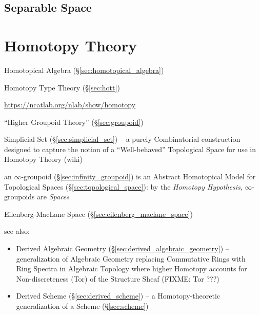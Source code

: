 \subsection{Separable Space}\label{sec:separable_space}



\section{Homotopy Theory}\label{sec:homotopy_theory}

Homotopical Algebra (\S\ref{sec:homotopical_algebra})

Homotopy Type Theory (\S\ref{sec:hott})

\url{https://ncatlab.org/nlab/show/homotopy}

``Higher Groupoid Theory'' (\S\ref{sec:groupoid})

Simplicial Set (\S\ref{sec:simplicial_set}) -- a purely Combinatorial
construction designed to capture the notion of a ``Well-behaved'' Topological
Space for use in Homotopy Theory (wiki)

\fist an $\infty$-groupoid (\S\ref{sec:infinity_groupoid}) is an Abstract
Homotopical Model for Topological Spaces (\S\ref{sec:topological_space}): by the
\emph{Homotopy Hypothesis}, $\infty$-groupoids are \emph{Spaces}

Eilenberg-MacLane Space (\S\ref{sec:eilenberg_maclane_space})

see also:
\begin{itemize}
  \item Derived Algebraic Geometry (\S\ref{sec:derived_algebraic_geometry}) --
    generalization of Algebraic Geometry replacing Commutative Rings with Ring
    Spectra in Algebraic Topology where higher Homotopy accounts for
    Non-discreteness (Tor) of the Structure Sheaf (FIXME: Tor ???)
  \item Derived Scheme (\S\ref{sec:derived_scheme}) -- a Homotopy-theoretic
    generalization of a Scheme (\S\ref{sec:scheme})
\end{itemize}



